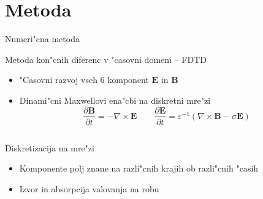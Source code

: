 \documentclass{beamer}
\newcommand{\odvod}[2]{\frac{\partial #1}{\partial #2}}
\renewcommand{\vec}{\mathbf}
\newcommand{\eps}{\varepsilon}
\begin{document}
\section{Metoda}

\begin{frame}{Numeri"cna metoda}
 \begin{block}{Metoda kon"cnih diferenc v "casovni domeni -- FDTD}
  \begin{itemize}
   \item "Casovni razvoj vseh 6 komponent $\vec E$ in $\vec B$
   \item Dinami"cni Maxwellovi ena"cbi na diskretni mre"zi
   \begin{equation*}
     \odvod{\vec{B}}{t} = -\nabla \times \vec{E} \qquad \odvod{\vec{E}}{t} = \eps^{-1} (\nabla \times \vec{B} - \sigma \vec E)
   \end{equation*}
  \end{itemize}
 \end{block}
 
 \begin{columns}
   \begin{block}{Diskretizacija na mre"zi}
    \begin{itemize}
	\item Komponente polj znane na razli"cnih krajih ob razli"cnih "casih
	\item Izvor in absorpcija valovanja na robu
      \end{itemize}
    \end{block}
    

 \end{columns}
\end{frame}
\end{document}

